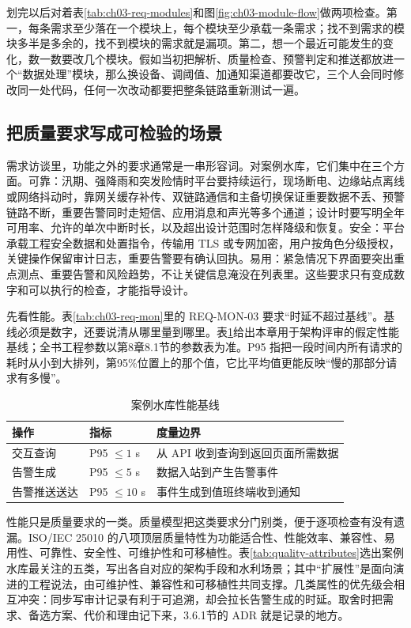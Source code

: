 划完以后对着表\ref{tab:ch03-req-modules}和图\ref{fig:ch03-module-flow}做两项检查。第一，每条需求至少落在一个模块上，每个模块至少承载一条需求；找不到需求的模块多半是多余的，找不到模块的需求就是漏项。第二，想一个最近可能发生的变化，数一数要改几个模块。假如当初把解析、质量检查、预警判定和推送都放进一个“数据处理”模块，那么换设备、调阈值、加通知渠道都要改它，三个人会同时修改同一处代码，任何一次改动都要把整条链路重新测试一遍。

\subsection{把质量要求写成可检验的场景}

需求访谈里，功能之外的要求通常是一串形容词。对案例水库，它们集中在三个方面。可靠：汛期、强降雨和突发险情时平台要持续运行，现场断电、边缘站点离线或网络抖动时，靠网关缓存补传、双链路通信和主备切换保证重要数据不丢、预警链路不断，重要告警同时走短信、应用消息和声光等多个通道；设计时要写明全年可用率、允许的单次中断时长，以及超出设计范围时怎样降级和恢复。安全：平台承载工程安全数据和处置指令，传输用 TLS 或专网加密，用户按角色分级授权，关键操作保留审计日志，重要告警要有确认回执。易用：紧急情况下界面要突出重点测点、重要告警和风险趋势，不让关键信息淹没在列表里。这些要求只有变成数字和可以执行的检查，才能指导设计。

先看性能。表\ref{tab:ch03-req-mon}里的 REQ-MON-03 要求“时延不超过基线”。基线必须是数字，还要说清从哪里量到哪里。表\ref{tab:performance-baseline}给出本章用于架构评审的假定性能基线；全书工程参数以第8章8.1节的参数表为准。P95 指把一段时间内所有请求的耗时从小到大排列，第95\%位置上的那个值，它比平均值更能反映“慢的那部分请求有多慢”。

\begin{table}[htbp]
\centering
\caption{案例水库性能基线}\label{tab:performance-baseline}
\begin{tabular}{p{4.2cm}p{3.2cm}p{6.0cm}}
\toprule
操作 & 指标 & 度量边界 \\
\midrule
交互查询 & P95 $\leq 1$ s & 从 API 收到查询到返回页面所需数据 \\
告警生成 & P95 $\leq 5$ s & 数据入站到产生告警事件 \\
告警推送送达 & P95 $\leq 10$ s & 事件生成到值班终端收到通知 \\
\bottomrule
\end{tabular}
\end{table}

性能只是质量要求的一类。质量模型把这类要求分门别类，便于逐项检查有没有遗漏\cite{ISO25010,GB2006}。ISO/IEC 25010 的八项顶层质量特性为功能适合性、性能效率、兼容性、易用性、可靠性、安全性、可维护性和可移植性。表\ref{tab:quality-attributes}选出案例水库最关注的五类，写出各自对应的架构手段和水利场景；其中“扩展性”是面向演进的工程说法，由可维护性、兼容性和可移植性共同支撑。几类属性的优先级会相互冲突：同步写审计记录有利于可追溯，却会拉长告警生成的时延。取舍时把需求、备选方案、代价和理由记下来，3.6.1节的 ADR 就是记录的地方。

